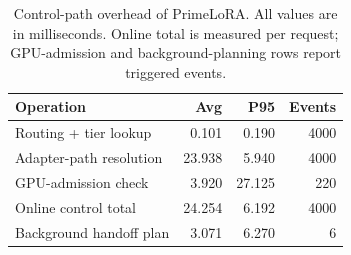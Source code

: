 \begin{table}[t]
\centering
\caption{Control-path overhead of PrimeLoRA. All values are in milliseconds. Online total is measured per request; GPU-admission and background-planning rows report triggered events.}
\label{tab:control_path_overhead}
\footnotesize
\setlength{\tabcolsep}{2.6pt}
\renewcommand{\arraystretch}{1.10}
\begin{tabular}{lrrr}
\toprule
Operation & Avg & P95 & Events \\
\midrule
Routing + tier lookup & 0.101 & 0.190 & 4000 \\
Adapter-path resolution & 23.938 & 5.940 & 4000 \\
GPU-admission check & 3.920 & 27.125 & 220 \\
Online control total & 24.254 & 6.192 & 4000 \\
Background handoff plan & 3.071 & 6.270 & 6 \\
\bottomrule
\end{tabular}
\end{table}
